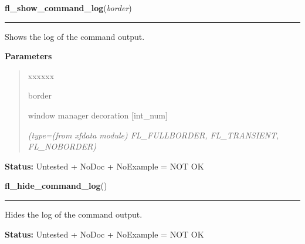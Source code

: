     \label{xformslib:library:fl_show_command_log}

    \vspace{0.5ex}

\hspace{.8\funcindent}\begin{boxedminipage}{\funcwidth}

    \raggedright \textbf{fl\_show\_command\_log}(\textit{border})

    \vspace{-1.5ex}

    \rule{\textwidth}{0.5\fboxrule}
\setlength{\parskip}{2ex}
    Shows the log of the command output.

\setlength{\parskip}{1ex}
      \textbf{Parameters}
      \vspace{-1ex}

      \begin{quote}
        \begin{Ventry}{xxxxxx}

          \item[border]

          window manager decoration [int\_num]

            {\it (type=(from xfdata module) FL\_FULLBORDER, FL\_TRANSIENT, FL\_NOBORDER)}

        \end{Ventry}

      \end{quote}

\textbf{Status:} Untested + NoDoc + NoExample = NOT OK



    \end{boxedminipage}

    \label{xformslib:library:fl_hide_command_log}

    \vspace{0.5ex}

\hspace{.8\funcindent}\begin{boxedminipage}{\funcwidth}

    \raggedright \textbf{fl\_hide\_command\_log}()

    \vspace{-1.5ex}

    \rule{\textwidth}{0.5\fboxrule}
\setlength{\parskip}{2ex}
    Hides the log of the command output.

\setlength{\parskip}{1ex}
\textbf{Status:} Untested + NoDoc + NoExample = NOT OK



    \end{boxedminipage}

